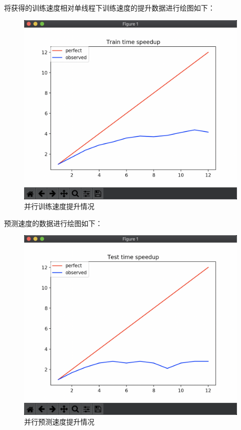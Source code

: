 \documentclass[12pt]{article}
\begin{document}
将获得的训练速度相对单线程下训练速度的提升数据进行绘图如下：
\begin{figure}[H]
    \centering
    \includegraphics[scale=0.35]{train_time_speedup.png}
    \caption{并行训练速度提升情况}
    \label{}
\end{figure}

预测速度的数据进行绘图如下：
\begin{figure}[H]
    \centering
    \includegraphics[scale=0.35]{test_time_speedup.png}
    \caption{并行预测速度提升情况}
    \label{}
\end{figure}
\end{document}
